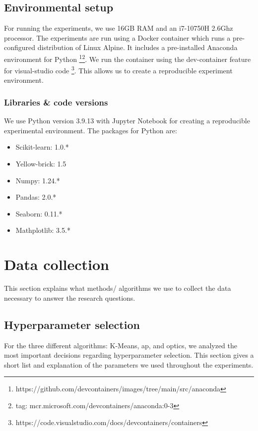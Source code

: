 \subsection{Environmental setup}
For running the experiments, we use 16GB RAM and an i7-10750H 2.6Ghz processor.
The experiments are run using a Docker container which runs a pre-configured distribution of Linux Alpine.
It includes a pre-installed Anaconda environment for Python \footnote{https://github.com/devcontainers/images/tree/main/src/anaconda}\footnote{tag: mcr.microsoft.com/devcontainers/anaconda:0-3}.
We run the container using the dev-container feature for visual-studio code \footnote{https://code.visualstudio.com/docs/devcontainers/containers}.
This allows us to create a reproducible experiment environment.
\subsubsection{Libraries \& code versions}
We use Python version 3.9.13 with Jupyter Notebook for creating a reproducible experimental environment.
The packages for Python are:
\begin{itemize}
  \item Scikit-learn: 1.0.*
  \item Yellow-brick: 1.5
  \item Numpy: 1.24.*
  \item Pandas: 2.0.*
  \item Seaborn: 0.11.*
  \item Mathplotlib: 3.5.*
\end{itemize}

\section{Data collection}
This section explains what methods/ algorithms we use to collect the data necessary to answer the research questions.
\subsection{Hyperparameter selection}
For the three different algorithms: K-Means, \gls{ap}, and \gls{optics}, we analyzed the most important decisions regarding hyperparameter selection.
This section gives a short list and explanation of the parameters we used throughout the experiments.
